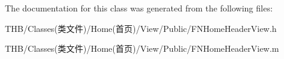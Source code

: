 The documentation for this class was generated from the following files\+:\begin{DoxyCompactItemize}
\item 
T\+H\+B/\+Classes(类文件)/\+Home(首页)/\+View/\+Public/F\+N\+Home\+Header\+View.\+h\item 
T\+H\+B/\+Classes(类文件)/\+Home(首页)/\+View/\+Public/F\+N\+Home\+Header\+View.\+m\end{DoxyCompactItemize}
